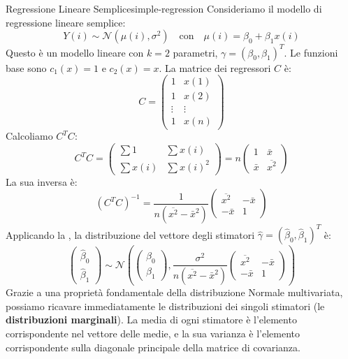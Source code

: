\begin{esempio}{Regressione Lineare Semplice}{simple-regression}
Consideriamo il modello di regressione lineare semplice:
\[
Y(i) \sim \mathcal{N}(\mu(i), \sigma^2) \quad \text{con} \quad \mu(i) = \beta_0 + \beta_1 x(i)
\]
Questo è un modello lineare con $k=2$ parametri, $\gamma = (\beta_0, \beta_1)^T$. Le funzioni base sono $c_1(x)=1$ e $c_2(x)=x$. La matrice dei regressori $C$ è:
\[
C = \begin{pmatrix}
1 & x(1) \\
1 & x(2) \\
\vdots & \vdots \\
1 & x(n)
\end{pmatrix}
\]
Calcoliamo $C^T C$:
\[
C^T C = \begin{pmatrix}
\sum 1 & \sum x(i) \\
\sum x(i) & \sum x(i)^2
\end{pmatrix} = n \begin{pmatrix}
1 & \bar{x} \\
\bar{x} & \overline{x^2}
\end{pmatrix}
\]
La sua inversa è:
\[
(C^T C)^{-1} = \frac{1}{n(\overline{x^2} - \bar{x}^2)} \begin{pmatrix}
\overline{x^2} & -\bar{x} \\
-\bar{x} & 1
\end{pmatrix}
\]
Applicando la , la distribuzione del vettore degli stimatori $\hat{\gamma} = (\hat{\beta}_0, \hat{\beta}_1)^T$ è:
\[
\begin{pmatrix} \hat{\beta}_0 \\ \hat{\beta}_1 \end{pmatrix} \sim \mathcal{N} \left( \begin{pmatrix} \beta_0 \\ \beta_1 \end{pmatrix}, \frac{\sigma^2}{n(\overline{x^2}-\bar{x}^2)} \begin{pmatrix} \overline{x^2} & -\bar{x} \\ -\bar{x} & 1 \end{pmatrix} \right)
\]
Grazie a una proprietà fondamentale della distribuzione Normale multivariata, possiamo ricavare immediatamente le distribuzioni dei singoli stimatori (le \textbf{distribuzioni marginali}). La media di ogni stimatore è l'elemento corrispondente nel vettore delle medie, e la sua varianza è l'elemento corrispondente sulla diagonale principale della matrice di covarianza.
\begin{itemize}

\end{itemize}
\end{esempio}
